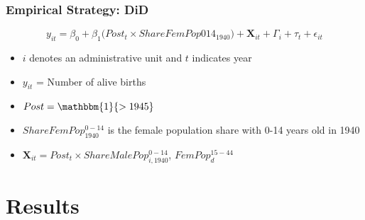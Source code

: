 \documentclass[aspectratio=169]{beamer}
\begin{document}
\begin{frame}[label=empirical_reg]
\frametitle{Empirical Strategy: DiD}
 
 \begin{equation}\label{main_eq}
y_{it} =\beta_0+  \beta_1   \big( \textit{Post}_t \times ShareFemPop014_{1940}\big)+\mathbf{X}_{it}+\Gamma_i+ \tau_{t}+\epsilon_{it}
\end{equation}
\smallskip
\begin{itemize}
\item  $i$  denotes an administrative unit and $t$  indicates year
\medskip\pause
\item $y_{it}$ = Number of alive births 
\medskip\pause
\item $Post= \mathbbm{1} \{> 1945\}$ 
\medskip
\pause
\item $ShareFemPop^{0-14}_{1940}$ is the female population share with 0-14 years old in 1940
\medskip

\pause
\item $\mathbf{X}_{it} = Post_t \times ShareMalePop^{0-14}_{i,1940}$, $FemPop^{15-44}_d$

\end{itemize}

\medskip

\hyperlink{map_together}{} \hyperlink{balancing}{} \hyperlink{descriptives}{} 

 
\end{frame}


\section{Results}
\end{document}

